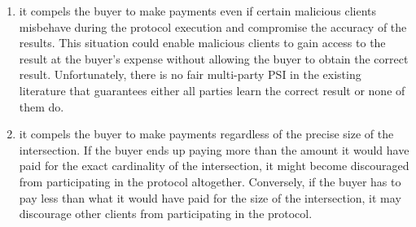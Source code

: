 \begin{enumerate}
\item it compels the buyer to make payments even if certain malicious clients misbehave during the protocol execution and compromise the accuracy of the results. This situation could enable malicious clients to gain access to the result at the buyer's expense without allowing the buyer to obtain the correct result. Unfortunately, there is no fair multi-party PSI in the existing literature that guarantees either all parties learn the correct result or none of them do. 

\item it compels the buyer to make payments regardless of the precise size of the intersection. If the buyer ends up paying more than the amount it would have paid for the exact cardinality of the intersection, it might become discouraged from participating in the protocol altogether. Conversely, if the buyer has to pay less than what it would have paid for the size of the intersection, it may discourage other clients from participating in the protocol.

\end{enumerate}






 






